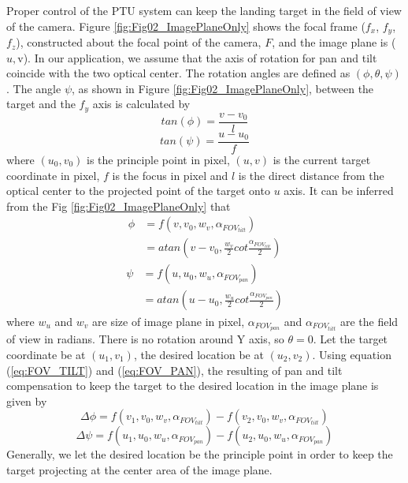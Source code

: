 \documentclass[journal,article,submit,moreauthors,pdftex,10pt,a4paper]{mdpi}
\begin{document}
Proper control of the PTU system can keep the landing target in the field of view of the camera. Figure \ref{fig:Fig02_ImagePlaneOnly} shows the focal frame ($f_x$, $f_y$, $f_z$), constructed about the focal point of the camera, $F$, and the image plane is ($u, $v).  In our application, we assume that the axis of rotation for pan and tilt coincide with the two optical center. The rotation angles are defined as $(\phi, \theta, \psi)$. The angle $\psi$, as shown in Figure  \ref{fig:Fig02_ImagePlaneOnly}, between the target and the $f_y$ axis is calculated by
\begin{equation}
tan(\phi)=\frac{v-v_0}{l}
\end{equation}
\begin{equation}
tan(\psi)=\frac{u-u_0}{f}
\end{equation}
where $(u_0, v_0)$ is the principle point in pixel, $(u, v)$ is the current target coordinate in pixel, $f$ is the focus in pixel and $l$ is the direct distance from the optical center to the projected point of the target onto $u$ axis. It can be inferred from the Fig \ref{fig:Fig02_ImagePlaneOnly} that
\begin{align} \label{eq:FOV_TILT}
\phi &=f(v, v_0, w_v, \alpha_{FOV_{tilt}}) \\
&=atan(v-v_0, \frac{w_v}{2}cot \frac{\alpha_{FOV_{tilt}}}{2})
\end{align}
\begin{align} \label{eq:FOV_PAN}
\psi &=f(u, u_0, w_u, \alpha_{FOV_{pan}}) \\
&=atan(u-u_0, \frac{w_u}{2}cot\frac{\alpha_{FOV_{pan}}}{2})
\end{align}
where $w_u$ and $w_v$ are size of image plane in pixel, $\alpha_{FOV_{pan}}$ and $\alpha_{FOV_{tilt}}$ are the field of view in radians. There is no rotation around Y axis, so $\theta = 0$. Let the target coordinate be at $(u_1, v_1)$, the desired location be at $(u_2, v_2)$. Using equation (\ref{eq:FOV_TILT}) and (\ref{eq:FOV_PAN}), the resulting of pan and tilt compensation to keep the target to the desired location in the image plane is given by
\begin{equation}
\Delta\phi=f(v_1,v_0,w_v, \alpha_{FOV_{tilt}})-f(v_2,v_0, w_v, \alpha_{FOV_{tilt}})
\end{equation}
\begin{equation}
\Delta\psi=f(u_1,u_0,w_u, \alpha_{FOV_{pan}})-f(u_2,u_0, w_u, \alpha_{FOV_{pan}})
\end{equation}
Generally, we let the desired location be the principle point in order to keep the target projecting at the center area of the image plane.
\end{document}
